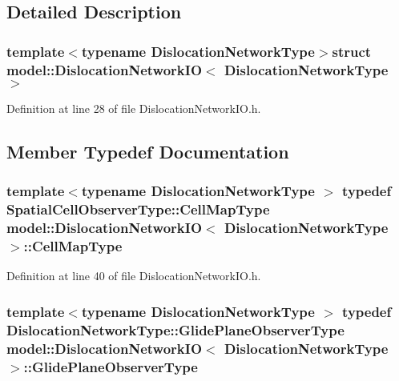 \subsection{Detailed Description}
\subsubsection*{template$<$typename Dislocation\+Network\+Type$>$struct model\+::\+Dislocation\+Network\+I\+O$<$ Dislocation\+Network\+Type $>$}



Definition at line 28 of file Dislocation\+Network\+I\+O.\+h.



\subsection{Member Typedef Documentation}
\hypertarget{structmodel_1_1_dislocation_network_i_o_af2ad1c2da5b8cd4a65070f03ccf1f05d}{}
\subsubsection[{Cell\+Map\+Type}]{\setlength{\rightskip}{0pt plus 5cm}template$<$typename Dislocation\+Network\+Type $>$ typedef Spatial\+Cell\+Observer\+Type\+::\+Cell\+Map\+Type {\bf model\+::\+Dislocation\+Network\+I\+O}$<$ Dislocation\+Network\+Type $>$\+::{\bf Cell\+Map\+Type}}\label{structmodel_1_1_dislocation_network_i_o_af2ad1c2da5b8cd4a65070f03ccf1f05d}


Definition at line 40 of file Dislocation\+Network\+I\+O.\+h.

\hypertarget{structmodel_1_1_dislocation_network_i_o_aa36bea0cc57a8e50cf51a19f41726567}{}
\subsubsection[{Glide\+Plane\+Observer\+Type}]{\setlength{\rightskip}{0pt plus 5cm}template$<$typename Dislocation\+Network\+Type $>$ typedef Dislocation\+Network\+Type\+::\+Glide\+Plane\+Observer\+Type {\bf model\+::\+Dislocation\+Network\+I\+O}$<$ Dislocation\+Network\+Type $>$\+::{\bf Glide\+Plane\+Observer\+Type}}\label{structmodel_1_1_dislocation_network_i_o_aa36bea0cc57a8e50cf51a19f41726567}


